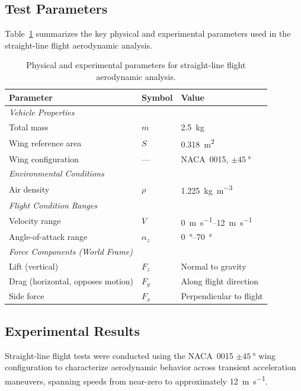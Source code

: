 \subsection{Test Parameters}\label{sec:full-regime-parameters}

Table~\ref{tab:full_regime_parameters} summarizes the key physical and experimental parameters used in the straight-line flight aerodynamic analysis.

\begin{table}[htbp]
\centering
\caption{Physical and experimental parameters for straight-line flight aerodynamic analysis.}
\label{tab:full_regime_parameters}
\begin{tabular}{lll}
\hline
\textbf{Parameter} & \textbf{Symbol} & \textbf{Value} \\
\hline
\multicolumn{3}{l}{\textit{Vehicle Properties}} \\
Total mass & $m$ & \SI{2.5}{\kilogram} \\
Wing reference area & $S$ & \SI{0.318}{\meter\squared} \\
Wing configuration & --- & NACA~0015, $\pm\SI{45}{\degree}$ \\
\hline
\multicolumn{3}{l}{\textit{Environmental Conditions}} \\
Air density & $\rho$ & \SI{1.225}{\kilogram\per\meter\cubed} \\
\hline
\multicolumn{3}{l}{\textit{Flight Condition Ranges}} \\
Velocity range & $V$ & \SIrange{0}{12}{\meter\per\second} \\
Angle-of-attack range & $\alpha_z$ & \SIrange{0}{70}{\degree} \\
\hline
\multicolumn{3}{l}{\textit{Force Components (World Frame)}} \\
Lift (vertical) & $F_z$ & Normal to gravity \\
Drag (horizontal, opposes motion) & $F_y$ & Along flight direction \\
Side force & $F_x$ & Perpendicular to flight \\
\hline
\end{tabular}
\end{table}

\subsection{Experimental Results}\label{sec:full-regime-results}

Straight-line flight tests were conducted using the NACA~0015 $\pm\SI{45}{\degree}$ wing configuration to characterize aerodynamic behavior across transient acceleration maneuvers, spanning speeds from near-zero to approximately \SI{12}{\meter\per\second}.


